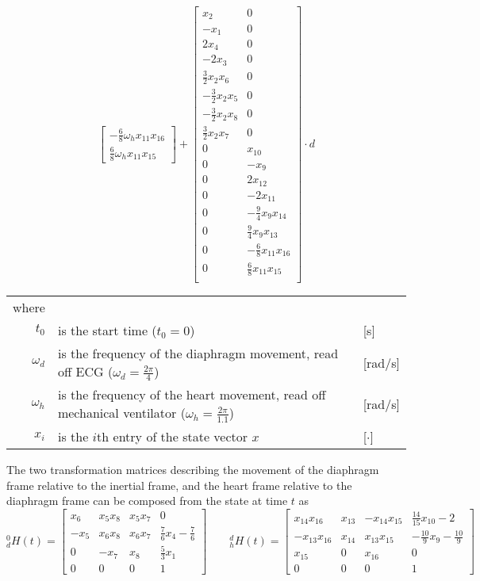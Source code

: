 \begin{equation}
\begin{bmatrix}
-\tfrac{6}{8} \omega_h x_11 x_{16}\\
\tfrac{6}{8} \omega_h x_11 x_{15}
\end{bmatrix}
+
\begin{bmatrix}
x_2&0\\
-x_1&  0\\
2 x_4& 0\\
-2 x_3&0\\
\tfrac{3}{2} x_2 x_6 & 0\\
-\tfrac{3}{2} x_2 x_5 & 0\\
-\tfrac{3}{2} x_2 x_8 & 0\\
\tfrac{3}{2} x_2 x_7  & 0\\
0& x_{10}\\
0& -x_9\\
0& 2 x_{12}\\
0& -2 x_{11}\\
0& -\tfrac{9}{4} x_9 x_{14}\\
0& \tfrac{9}{4} x_9 x_{13}\\
0& -\tfrac{6}{8} x_{11} x_{16}\\
0& \tfrac{6}{8} x_{11} x_{15}\\
\end{bmatrix}
\cdot d
\end{equation}
\begin{tabular}{rll}
where & &\\
$t_0$ & is the start time ($t_0=0$) & [s]\\
$\omega_d$ & is the frequency of the diaphragm movement, read off ECG ($\omega_d=\tfrac{2\pi}{4}$) & [rad/s]\\
$\omega_h$ & is the frequency of the heart movement, read off mechanical ventilator ($\omega_h=\tfrac{2\pi}{1.1}$) & [rad/s]\\
$x_i$ & is the $i$th entry of the state vector $x$ & [$\cdot$]
\end{tabular}

The two transformation matrices describing the movement of the diaphragm frame relative to the inertial frame, and the heart frame relative to the diaphragm frame can be composed from the state at time $t$ as \citep{bib:heart_model}
\begin{equation}
^0_dH(t) = 
\begin{bmatrix}
x_6 & x_5 x_8 & x_5 x_7 & 0\\
-x_5 & x_6 x_8 & x_6 x_7 & \tfrac{7}{6} x_4 - \tfrac{7}{6} \\
0 & -x_7 & x_8 & \tfrac{5}{3}x_1\\
0 & 0 & 0 & 1
\end{bmatrix}
\quad\quad
^d_hH(t) = 
\begin{bmatrix}
x_{14} x_{16} & x_{13} & -x_{14} x_{15} & \tfrac{14}{15} x_{10}-2\\
-x_{13}  x_{16} & x_{14} & x_{13} x_{15} & -\tfrac{10}{9} x_9 - \tfrac{10}{9}\\
x_{15} & 0 & x_{16} & 0\\
0 & 0 & 0 & 1
\end{bmatrix}
\end{equation}

